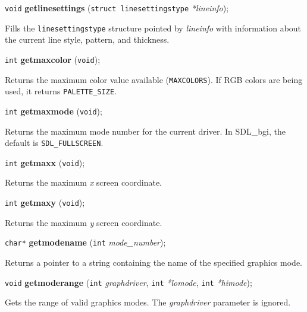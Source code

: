 \documentclass[a4paper,11pt]{article}
\newcommand{\SDLbgi}{SDL\_bgi}
\newcommand{\V}{\texttt{void}}      %
\newcommand{\I}{\texttt{int}}       %
\newcommand{\func}[1]{\textbf{#1}}  %
\newcommand{\A}[1]{\emph{#1}}       %
\newcommand{\T}[1]{\texttt{#1}}     %
\newenvironment{bgi}
{ %
  \begin{snugshade}
}
{ %
  \end{snugshade}
}
\begin{document}

\begin{bgi}
\V{} \func{getlinesettings} (\texttt{struct linesettingstype}
\A{*lineinfo});
\end{bgi}

Fills the \texttt{linesettingstype} structure pointed by \A{lineinfo}
with information about the current line style, pattern, and thickness.


\begin{bgi}
\I{} \func{getmaxcolor} (\V{});
\end{bgi}

Returns the maximum color value available (\T{MAXCOLORS}). If RGB
colors are being used, it returns \T{PALETTE\_SIZE}.


\begin{bgi}
\I{} \func{getmaxmode} (\V{}); 
\end{bgi}

Returns the maximum mode number for the current driver. In \SDLbgi,
the default is \T{SDL\_FULLSCREEN}.


\begin{bgi}
\I{} \func{getmaxx} (\V{});
\end{bgi}

Returns the maximum \A{x} screen coordinate.


\begin{bgi}
\I{} \func{getmaxy} (\V{});
\end{bgi}

Returns the maximum \A{y} screen coordinate.


\begin{bgi}
\texttt{char*} \func{getmodename} (\I{} \A{mode\_number});
\end{bgi}

Returns a pointer to a string containing the name of the specified
graphics mode.


\begin{bgi}
\V{} \func{getmoderange} (\I{} \A{graphdriver}, \I{} \A{*lomode}, \I{}
\A{*himode});
\end{bgi}

Gets the range of valid graphics modes. The \A{graphdriver} parameter
is ignored.

\end{document}
